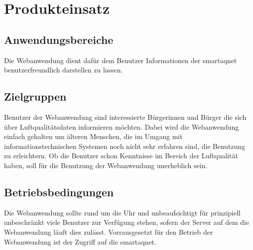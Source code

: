 \section{Produkteinsatz}

\subsection{Anwendungsbereiche}

Die \gls{Webanwendung} dient dafür dem Benutzer Informationen der \gls{smartaqnet} benutzerfreundlich darstellen zu lassen.

\subsection{Zielgruppen}

Benutzer der \gls{Webanwendung} sind interessierte Bürgerinnen und Bürger die sich über Luftqualitätsdaten informieren möchten. 
Dabei wird die \gls{Webanwendung} einfach gehalten um älteren Menschen, die im Umgang mit informationstechnischen Systemen noch nicht sehr erfahren sind, die Benutzung zu erleichtern.
Ob die Benutzer schon Kenntnisse im Bereich der Luftqualität haben, soll für die Benutzung der \gls{Webanwendung} unerheblich sein.

\subsection{Betriebsbedingungen}

Die \gls{Webanwendung} sollte rund um die Uhr und unbeaufsichtigt für prinzipiell unbeschränkt viele Benutzer zur Verfügung stehen, sofern der Server auf dem die \gls{Webanwendung} läuft dies zulässt. 
Vorrausgesetzt für den Betrieb der \gls{Webanwendung} ist der Zugriff auf die \gls{smartaqnet}.